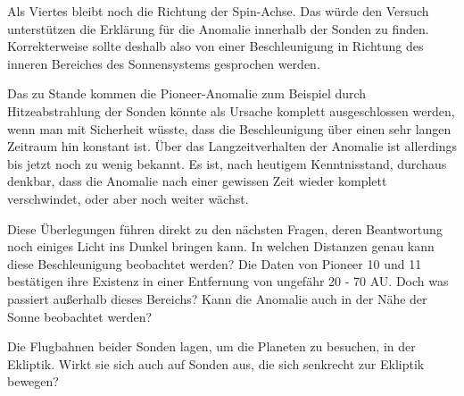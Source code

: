 \bigskip

Als Viertes bleibt noch die Richtung der Spin-Achse. Das w\"urde den
Versuch unterst\"utzen die Erkl\"arung f\"ur die Anomalie innerhalb der
Sonden zu finden. Korrekterweise sollte deshalb also von einer
Beschleunigung in Richtung des inneren Bereiches des Sonnensystems
gesprochen werden.


\bigskip

Das zu Stande kommen die Pioneer-Anomalie zum Beispiel durch
Hitzeabstrahlung der Sonden k\"onnte als Ursache komplett
ausgeschlossen werden, wenn man mit Sicherheit w\"usste, dass die
Beschleunigung \"uber einen sehr langen Zeitraum hin konstant ist.
\"Uber das Langzeitverhalten der Anomalie ist allerdings bis jetzt noch
zu wenig bekannt. Es ist, nach heutigem Kenntnisstand, durchaus
denkbar, dass die Anomalie nach einer gewissen Zeit wieder komplett
verschwindet, oder aber noch weiter w\"achst.


\bigskip

Diese \"Uberlegungen f\"uhren direkt zu den n\"achsten Fragen, deren
Beantwortung noch einiges Licht ins Dunkel bringen kann. In welchen
Distanzen genau kann diese Beschleunigung beobachtet werden? Die Daten
von Pioneer 10 und 11 best\"atigen ihre Existenz in einer Entfernung
von ungef\"ahr 20 - 70 AU. Doch was passiert au{\ss}erhalb dieses
Bereichs? Kann die Anomalie auch in der N\"ahe der Sonne beobachtet
werden? 

Die Flugbahnen beider Sonden lagen, um die Planeten zu besuchen, in der
Ekliptik. Wirkt sie sich auch auf Sonden aus, die sich senkrecht zur
Ekliptik bewegen?

